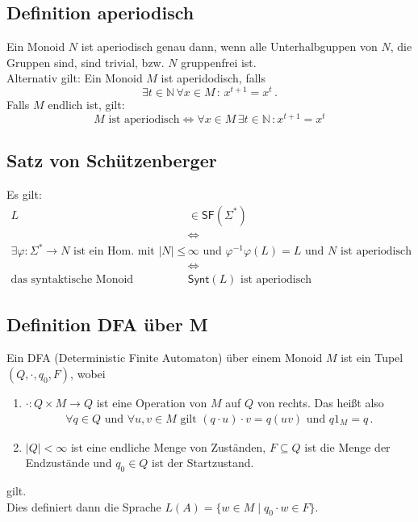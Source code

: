 \documentclass[12pt, german]{article}
\newcommand{\N}{\mathbb{N}}
\newcommand{\sigstern}{\Sigma^\ast}
\newcommand{\inv}{^{-1}}
\newcommand{\starfree}{\mathsf{SF}}
\newcommand{\synt}{\mathsf{Synt}}
\begin{document}
	\subsection{Definition aperiodisch}
	Ein Monoid $N$ ist aperiodisch genau dann, wenn alle Unterhalbguppen von $N$, die Gruppen sind, sind trivial, bzw. $N$ gruppenfrei ist.\\
	Alternativ gilt: Ein Monoid $M$	ist aperidodisch, falls $$\exists t \in \N \, \forall x \in M\, : \, x^{t+1} = x^t \, .$$
	Falls $M$ endlich ist, gilt: $$M \text{ ist aperiodisch} \iff \forall x \in M \, \exists t \in \N \,  : x^{t+1} = x^t$$
	
	
	\subsection{Satz von Schützenberger}
	Es gilt: 
	\begin{align*}
		L &\in \starfree(\sigstern)\\
		&\iff \\
		\exists \varphi: \sigstern \to N \text{ ist ein Hom. mit } |N| \leq &\infty \text{ und } \varphi\inv\varphi(L) = L \text{ und $N$ ist aperiodisch} \\ 
		&\iff \\
		\text{das syntaktische Monoid } &\synt(L) \text{ ist aperiodisch}
	\end{align*}
	
	\subsection{Definition DFA über M}
	Ein DFA (Deterministic Finite Automaton) über einem Monoid $M$ ist ein Tupel $(Q, \cdot, q_0, F)$, wobei
	\begin{enumerate}[label=\arabic*)]
		\item $\cdot: Q \times M \to Q$ ist eine Operation von $M$ auf $Q$ von rechts. Das heißt also
		\begin{align*}
			\forall q \in Q \text{ und } \forall u,v \in M \text{ gilt } (q \cdot u) \cdot v = q(uv) \text{ und } q1_M = q \, . 
		\end{align*}
		\item $|Q| < \infty$ ist eine endliche Menge von Zuständen, $F\subseteq Q$ ist die Menge der Endzustände und $q_0 \in Q$ ist der Startzustand. \\
	\end{enumerate}
	gilt.\\
	Dies definiert dann die Sprache $L(A) = \{w \in M \mid q_0\cdot w \in F\}$.
	
\end{document}
